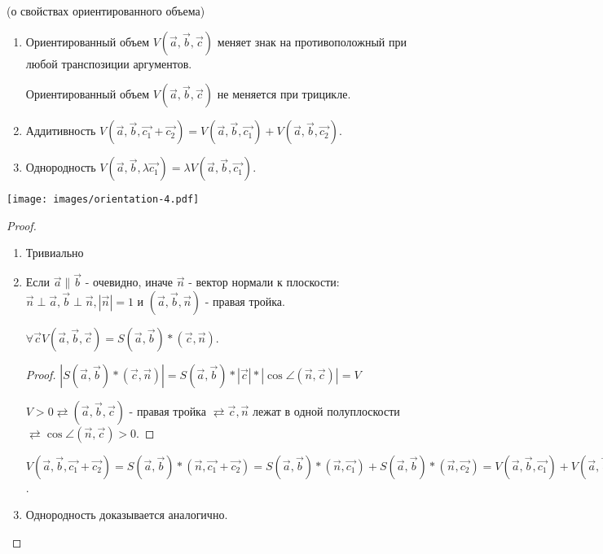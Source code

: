 \begin{theorem}
	(о свойствах ориентированного объема)
	
	\begin{enumerate}[]
		
		\item Ориентированный объем  $V(\vec{a},\vec{b},\vec{c})$ меняет знак на противоположный при любой транспозиции аргументов.
		
		Ориентированный объем  $V(\vec{a},\vec{b},\vec{c})$ не меняется при трицикле.
		
		\item Аддитивность $V(\vec{a},\vec{b},\vec{c_1} + \vec{c_2}) = V(\vec{a},\vec{b},\vec{c_1}) + V(\vec{a},\vec{b},\vec{c_2})$.
		
		\item Однородность $V(\vec{a},\vec{b},\lambda\vec{c_1}) = \lambda V(\vec{a},\vec{b},\vec{c_1}) $.
	\end{enumerate}
\end{theorem}
\vspace{.7cm}
\texttt{[image: images/orientation-4.pdf]}\hfill 
\vspace{.7cm}
\begin{proof}
	\begin{enumerate}[]
		\item Тривиально
		
		\item Если $\vec{a} \parallel \vec{b}$ - очевидно, иначе $\vec{n}$ - вектор нормали к плоскости: $\vec{n} \perp \vec{a}, \vec{b} \perp \vec{n}, |\vec{n}| = 1$ и $(\vec{a},\vec{b},\vec{n})$  - правая тройка.
		
		\begin{lemma}	
			$\forall \vec{c} V(\vec{a},\vec{b},\vec{c}) = S(\vec{a},\vec{b}) * (\vec{c}, \vec{n})$.
		\end{lemma}
		
		\begin{proof}
			
			$|S(\vec{a},\vec{b}) * (\vec{c},\vec{n})| = S(\vec{a},\vec{b}) * |\vec{c}|* |\cos{\angle(\vec{n},\vec{c})}| = V$
			
			$V > 0 \rightleftarrows (\vec{a},\vec{b},\vec{c}) $ - правая тройка $ \rightleftarrows \vec{c}, \vec{n}$ лежат в одной полуплоскости $\rightleftarrows \cos{\angle(\vec{n},\vec{c})} > 0$.
		\end{proof}
		
		
		$V(\vec{a},\vec{b},\vec{c_1} + \vec{c_2}) = S(\vec{a},\vec{b})*(\vec{n},\vec{c_1} + \vec{c_2}) = S(\vec{a},\vec{b})*(\vec{n},\vec{c_1}) + S(\vec{a},\vec{b})*(\vec{n},\vec{c_2}) = V(\vec{a},\vec{b},\vec{c_1}) + V(\vec{a},\vec{b},\vec{c_2})$.
		
		\item Однородность доказывается аналогично.
	\end{enumerate}
\end{proof}

